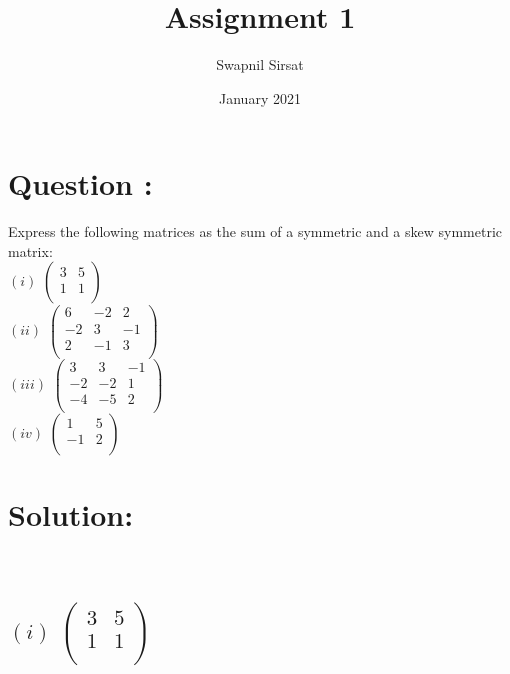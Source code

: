\documentclass{article}
\title{Assignment 1}
\author{Swapnil Sirsat}
\date{January 2021}
\begin{document}
\maketitle
\section*{Question :}

Express the following matrices as the sum of
a symmetric and a skew symmetric matrix:\\
$(i)$ $\begin{pmatrix}
    3 & 5\\
    1 & 1\\
\end{pmatrix}$\\
$(ii)$ $\begin{pmatrix}
    6 & -2 & 2\\
    -2 & 3 & -1\\
    2 & -1 & 3\\
\end{pmatrix}$\\
$(iii)$  $\begin{pmatrix}
3 & 3 & -1 \\
-2 & -2 & 1\\
-4 & -5 & 2\\
\end{pmatrix}$\\
$(iv)$ $\begin{pmatrix}
    1 & 5\\
    -1 & 2\\
\end{pmatrix}$\\
\section*{Solution:}\\ 
\subsection*{$(i)$ $\begin{pmatrix}
    3 & 5\\
    1 & 1\\
\end{pmatrix}$\\}
\end{document}
